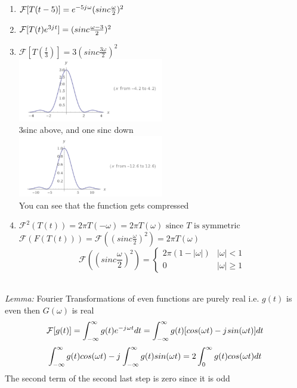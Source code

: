 \documentclass[11pt]{article}
\theoremstyle{definition}
\newcommand{\iu}{{j\mkern1mu}}
\newcommand{\F}{{\mathcal{F}}}
\begin{document}
\begin{enumerate}
    \item $\F[T(t-5)] = e^{-5\iu\omega}(sinc\frac{\omega}{2})^2$
    \item $\F[T(t)e^{3\iu t}] = (sinc\frac{\omega-3}{2})^2$
    \item $\F[T(\frac{t}{3})] = 3(sinc\frac{3\omega}{2})^2$\\
    \includegraphics[width=0.5\textwidth]{3sinc.png}\\
    3sinc above, and one sinc down\\
    \includegraphics[width=0.5\textwidth]{sinc.png}\\
    You can see that the function gets compressed
    \item $\F^2(T(t)) = 2\pi T(-\omega) = 2\pi T(\omega) \text{ since $T$ is symmetric}$\\
    $\F(F(T(t))) = \F((sinc\frac{\omega}{2})^2) = 2\pi T(\omega)$\\
    \[\F((sinc\frac{\omega}{2})^2) =  \begin{cases} 
      2\pi(1-|\omega|) & |\omega| < 1 \\
      0 & |\omega| \geq 1
   \end{cases}
\]\\
\end{enumerate}
\textit{Lemma:} Fourier Transformations of even functions are purely real i.e. $g(t)$ is even then $G(\omega)$ is real\\
$$\F[g(t)] = \int^{\infty}_{-\infty} g(t) e^{-\iu \omega t}dt = \int^{\infty}_{-\infty} g(t)[cos(\omega t) - \iu sin(\omega t)]dt$$
$$\int^{\infty}_{-\infty} g(t)cos(\omega t) - \iu \int^{\infty}_{-\infty} g(t) sin(\omega t) = 2\int_0^\infty g(t)cos(\omega t) dt$$
The second term of the second last step is zero since it is odd\\
\end{document}
